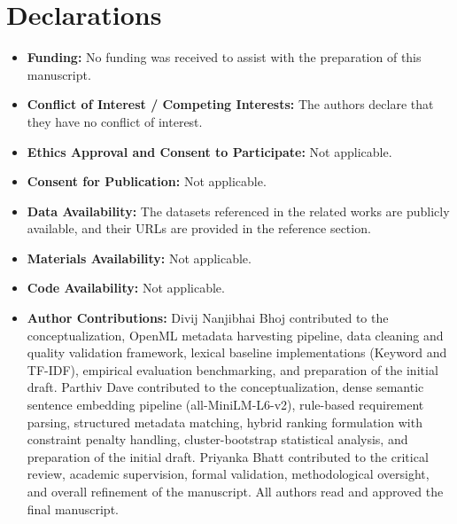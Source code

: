\documentclass[conference]{IEEEtran}
\begin{document}
\section*{Declarations}
\begin{itemize}
\item \textbf{Funding:} No funding was received to assist with the preparation of this manuscript.
\item \textbf{Conflict of Interest / Competing Interests:} The authors declare that they have no conflict of interest.
\item \textbf{Ethics Approval and Consent to Participate:} Not applicable.
\item \textbf{Consent for Publication:} Not applicable.
\item \textbf{Data Availability:} The datasets referenced in the related works are publicly available, and their URLs are provided in the reference section.
\item \textbf{Materials Availability:} Not applicable.
\item \textbf{Code Availability:} Not applicable.
\item \textbf{Author Contributions:} Divij Nanjibhai Bhoj contributed to the conceptualization, OpenML metadata harvesting pipeline, data cleaning and quality validation framework, lexical baseline implementations (Keyword and TF-IDF), empirical evaluation benchmarking, and preparation of the initial draft. Parthiv Dave contributed to the conceptualization, dense semantic sentence embedding pipeline (all-MiniLM-L6-v2), rule-based requirement parsing, structured metadata matching, hybrid ranking formulation with constraint penalty handling, cluster-bootstrap statistical analysis, and preparation of the initial draft. Priyanka Bhatt contributed to the critical review, academic supervision, formal validation, methodological oversight, and overall refinement of the manuscript. All authors read and approved the final manuscript.
\end{itemize}



\end{document}
